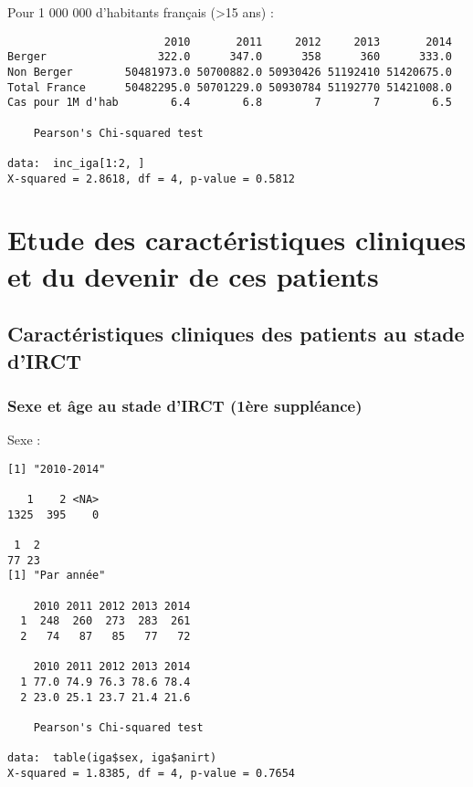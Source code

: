 \documentclass[11pt,a4paper]{article}\usepackage[]{graphicx}\usepackage[]{color}
\makeatletter
\newenvironment{kframe}{%
 \def\at@end@of@kframe{}%
 \ifinner\ifhmode%
  \def\at@end@of@kframe{\end{minipage}}%
  \begin{minipage}{\columnwidth}%
 \fi\fi%
 \def\FrameCommand##1{\hskip\@totalleftmargin \hskip-\fboxsep
 \colorbox{shadecolor}{##1}\hskip-\fboxsep
     \hskip-\linewidth \hskip-\@totalleftmargin \hskip\columnwidth}%
 \MakeFramed {\advance\hsize-\width
   \@totalleftmargin\z@ \linewidth\hsize
   \@setminipage}}%
 {\par\unskip\endMakeFramed%
 \at@end@of@kframe}
\newenvironment{knitrout}{}{} %
\makeatother
\begin{document}
Pour 1 000 000 d'habitants français (\textgreater 15 ans) :

\begin{knitrout}
\color{fgcolor}\begin{kframe}
\begin{verbatim}
                        2010       2011     2012     2013       2014
Berger                 322.0      347.0      358      360      333.0
Non Berger        50481973.0 50700882.0 50930426 51192410 51420675.0
Total France      50482295.0 50701229.0 50930784 51192770 51421008.0
Cas pour 1M d'hab        6.4        6.8        7        7        6.5

	Pearson's Chi-squared test

data:  inc_iga[1:2, ]
X-squared = 2.8618, df = 4, p-value = 0.5812
\end{verbatim}
\end{kframe}
\end{knitrout}

\section{Etude des caractéristiques cliniques et du devenir de ces patients}

  \subsection{Caractéristiques cliniques des patients au stade d’IRCT}
  
    \subsubsection{Sexe et âge au stade d’IRCT (1ère suppléance)}

Sexe :
\begin{knitrout}
\color{fgcolor}\begin{kframe}
\begin{verbatim}
[1] "2010-2014"

   1    2 <NA> 
1325  395    0 

 1  2 
77 23 
[1] "Par année"
   
    2010 2011 2012 2013 2014
  1  248  260  273  283  261
  2   74   87   85   77   72
   
    2010 2011 2012 2013 2014
  1 77.0 74.9 76.3 78.6 78.4
  2 23.0 25.1 23.7 21.4 21.6

	Pearson's Chi-squared test

data:  table(iga$sex, iga$anirt)
X-squared = 1.8385, df = 4, p-value = 0.7654
\end{verbatim}
\end{kframe}
\end{knitrout}
\end{document}
